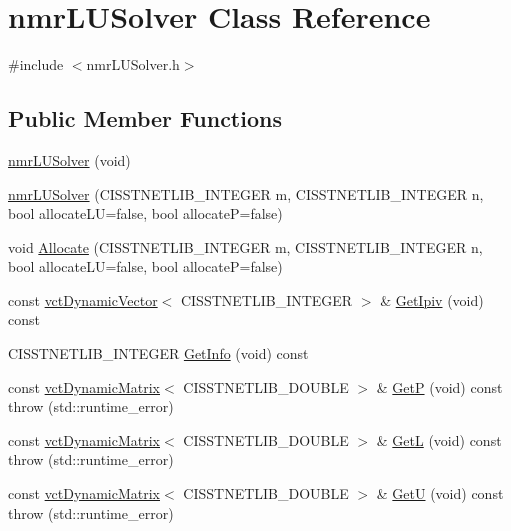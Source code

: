 \hypertarget{classnmr_l_u_solver}{}\section{nmr\+L\+U\+Solver Class Reference}
\label{classnmr_l_u_solver}


{\ttfamily \#include $<$nmr\+L\+U\+Solver.\+h$>$}

\subsection*{Public Member Functions}
\begin{DoxyCompactItemize}
\item 
\hyperlink{classnmr_l_u_solver_a40c3372d1d3cafb84e7fea271c415b32}{nmr\+L\+U\+Solver} (void)
\item 
\hyperlink{classnmr_l_u_solver_a2256f064d454e188084fbdae11d47dc6}{nmr\+L\+U\+Solver} (C\+I\+S\+S\+T\+N\+E\+T\+L\+I\+B\+\_\+\+I\+N\+T\+E\+G\+E\+R m, C\+I\+S\+S\+T\+N\+E\+T\+L\+I\+B\+\_\+\+I\+N\+T\+E\+G\+E\+R n, bool allocate\+L\+U=false, bool allocate\+P=false)
\item 
void \hyperlink{classnmr_l_u_solver_a3aafa2db62ce6f4325938e54bf285a64}{Allocate} (C\+I\+S\+S\+T\+N\+E\+T\+L\+I\+B\+\_\+\+I\+N\+T\+E\+G\+E\+R m, C\+I\+S\+S\+T\+N\+E\+T\+L\+I\+B\+\_\+\+I\+N\+T\+E\+G\+E\+R n, bool allocate\+L\+U=false, bool allocate\+P=false)
\item 
const \hyperlink{classvct_dynamic_vector}{vct\+Dynamic\+Vector}$<$ C\+I\+S\+S\+T\+N\+E\+T\+L\+I\+B\+\_\+\+I\+N\+T\+E\+G\+E\+R $>$ \& \hyperlink{classnmr_l_u_solver_ac4511fda0fb87a48e69d60edc4581cdf}{Get\+Ipiv} (void) const 
\item 
C\+I\+S\+S\+T\+N\+E\+T\+L\+I\+B\+\_\+\+I\+N\+T\+E\+G\+E\+R \hyperlink{classnmr_l_u_solver_a98347f4597679fa1175a4624419b8924}{Get\+Info} (void) const 
\item 
const \hyperlink{classvct_dynamic_matrix}{vct\+Dynamic\+Matrix}$<$ C\+I\+S\+S\+T\+N\+E\+T\+L\+I\+B\+\_\+\+D\+O\+U\+B\+L\+E $>$ \& \hyperlink{classnmr_l_u_solver_af8d3e46e6261ffa6272312622152c910}{Get\+P} (void) const   throw (std\+::runtime\+\_\+error)
\item 
const \hyperlink{classvct_dynamic_matrix}{vct\+Dynamic\+Matrix}$<$ C\+I\+S\+S\+T\+N\+E\+T\+L\+I\+B\+\_\+\+D\+O\+U\+B\+L\+E $>$ \& \hyperlink{classnmr_l_u_solver_a9d25755c14ae1c983da54325d793f1a8}{Get\+L} (void) const   throw (std\+::runtime\+\_\+error)
\item 
const \hyperlink{classvct_dynamic_matrix}{vct\+Dynamic\+Matrix}$<$ C\+I\+S\+S\+T\+N\+E\+T\+L\+I\+B\+\_\+\+D\+O\+U\+B\+L\+E $>$ \& \hyperlink{classnmr_l_u_solver_af4be769d987bb1a8df8a169d67c7c9ef}{Get\+U} (void) const   throw (std\+::runtime\+\_\+error)
\end{DoxyCompactItemize}
